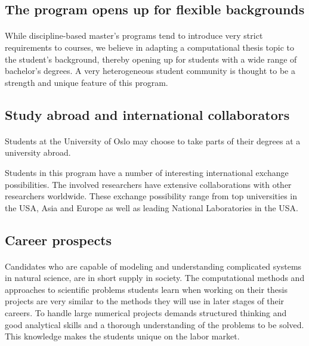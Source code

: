 \documentclass[%
oneside,                 %
final,                   %
10pt]{article}
\begin{document}
\subsection*{The program opens up for flexible backgrounds}


\paragraph{}
While discipline-based master's programs tend to introduce very strict
requirements to courses, we believe in adapting a computational thesis
topic to the student's background, thereby opening up for
students with a wide range of bachelor's degrees.
A very heterogeneous student community is thought to be a strength and
unique feature of this program.



\subsection*{Study abroad and international collaborators}


\paragraph{}

Students at the University of Oslo may choose to take parts of
their degrees at a university abroad.

Students in this program have a number of interesting international
exchange possibilities. The involved researchers have extensive
collaborations with other researchers worldwide. These exchange
possibility range from top universities in the USA, Asia and Europe as
well as leading National Laboratories in the USA.



\subsection*{Career prospects}


\paragraph{}
Candidates who are capable of modeling and understanding complicated
systems in natural science, are in short supply in society.  The
computational methods and approaches to scientific problems students learn
when working on their thesis projects are very similar to the methods
they will use in later stages of their careers.  To handle large
numerical projects demands structured thinking and good analytical
skills and a thorough understanding of the problems to be solved. This
knowledge makes the students unique on the labor market.
\end{document}
